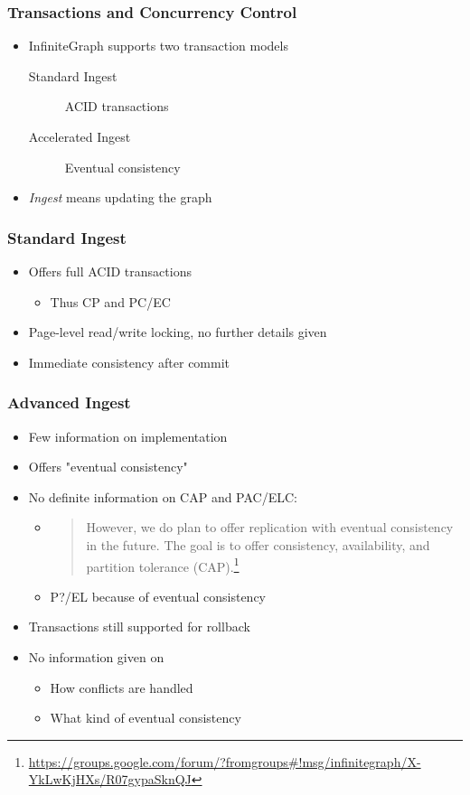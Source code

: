 
\begin{frame}
\frametitle{Transactions and Concurrency Control}
\begin{itemize}
\item InfiniteGraph supports two transaction models
\begin{description}
    \item[Standard Ingest] ACID transactions
    \item[Accelerated Ingest] Eventual consistency
\end{description}
\item \emph{Ingest} means updating the graph
\end{itemize}
\end{frame}

\begin{frame}
\frametitle{Standard Ingest}
\begin{itemize}
    \item Offers full ACID transactions
    \begin{itemize}
        \item Thus CP and PC/EC
    \end{itemize}
    \item Page-level read/write locking, no further details given
    \item Immediate consistency after commit
\end{itemize}
\end{frame}

\begin{frame}
\frametitle{Advanced Ingest}
\begin{itemize}
    \item Few information on implementation
    \item Offers "eventual consistency"
    \item No definite information on CAP and PAC/ELC:
    \begin{itemize}
        \item \begin{quote}
            However, we do plan to offer replication with eventual 
            consistency in the future.  The goal is to offer consistency, 
            availability, and partition tolerance (CAP).\footnote{\url{https://groups.google.com/forum/?fromgroups\#!msg/infinitegraph/X-YkLwKjHXs/R07gypaSknQJ}}
        \end{quote}
        \item P?/EL because of eventual consistency
    \end{itemize}
\item Transactions still supported for rollback
\item No information given on
\begin{itemize}
    \item How conflicts are handled
    \item What kind of eventual consistency
\end{itemize}
\end{itemize}
\end{frame}


